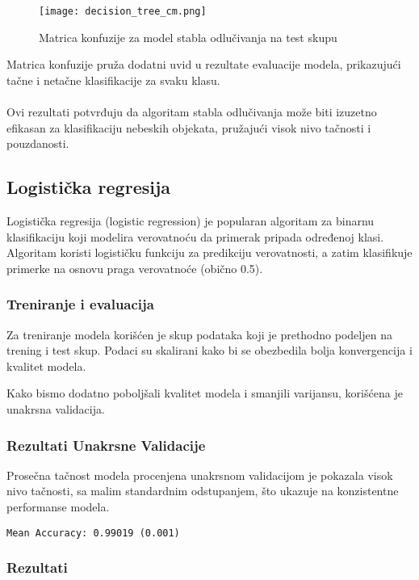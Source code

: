 \documentclass[a4paper,12pt]{article}
\begin{document}
\begin{figure}[H]
\centering
\texttt{[image: decision\_tree\_cm.png]}
\caption{Matrica konfuzije za model stabla odlučivanja na test skupu}
\label{fig:decision_tree_cm}
\end{figure}

Matrica konfuzije pruža dodatni uvid u rezultate evaluacije modela, prikazujući tačne i netačne klasifikacije za svaku klasu.
\\\\Ovi rezultati potvrđuju da algoritam stabla odlučivanja može biti izuzetno efikasan za klasifikaciju nebeskih objekata, pružajući visok nivo tačnosti i pouzdanosti.

\subsection{Logistička regresija}
Logistička regresija (logistic regression) je popularan algoritam za binarnu klasifikaciju koji modelira verovatnoću da primerak pripada određenoj klasi. Algoritam koristi logističku funkciju za predikciju verovatnosti, a zatim klasifikuje primerke na osnovu praga verovatnoće (obično 0.5).

\subsubsection{Treniranje i evaluacija}
Za treniranje modela korišćen je skup podataka koji je prethodno podeljen na trening i test skup. Podaci su skalirani kako bi se obezbedila bolja konvergencija i kvalitet modela.

Kako bismo dodatno poboljšali kvalitet modela i smanjili varijansu, korišćena je unakrsna validacija.

\subsubsection{Rezultati Unakrsne Validacije}
Prosečna tačnost modela procenjena unakrsnom validacijom je pokazala visok nivo tačnosti, sa malim standardnim odstupanjem, što ukazuje na konzistentne performanse modela.

\begin{verbatim}
Mean Accuracy: 0.99019 (0.001)
\end{verbatim}

\subsubsection{Rezultati}
\end{document}

